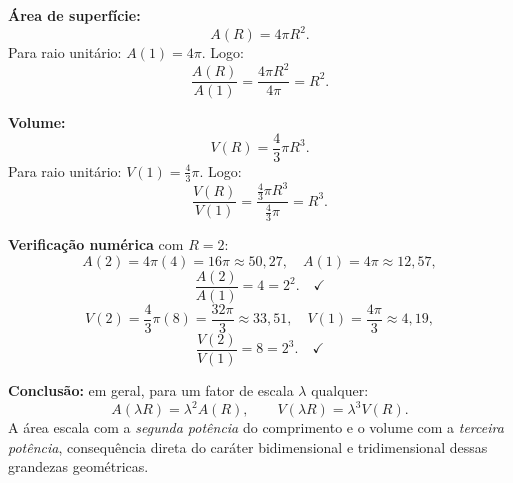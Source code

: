 \textbf{Área de superfície:}
\[
A(R)=4\pi R^2.
\]
Para raio unitário: $A(1)=4\pi$. Logo:
\[
\frac{A(R)}{A(1)}=\frac{4\pi R^2}{4\pi}=R^2.
\]

\textbf{Volume:}
\[
V(R)=\frac{4}{3}\pi R^3.
\]
Para raio unitário: $V(1)=\frac{4}{3}\pi$. Logo:
\[
\frac{V(R)}{V(1)}=\frac{\tfrac{4}{3}\pi R^3}{\tfrac{4}{3}\pi}=R^3.
\]

\textbf{Verificação numérica} com $R=2$:
\[
A(2)=4\pi(4)=16\pi\approx50{,}27, \quad A(1)=4\pi\approx12{,}57,
\]
\[
\frac{A(2)}{A(1)}=4=2^2.\quad \checkmark
\]
\[
V(2)=\frac{4}{3}\pi(8)=\frac{32\pi}{3}\approx33{,}51, \quad V(1)=\frac{4\pi}{3}\approx4{,}19,
\]
\[
\frac{V(2)}{V(1)}=8=2^3.\quad\checkmark
\]

\textbf{Conclusão:} em geral, para um fator de escala $\lambda$ qualquer:
\[
A(\lambda R)=\lambda^2 A(R),\qquad V(\lambda R)=\lambda^3 V(R).
\]
A área escala com a \emph{segunda potência} do comprimento e o volume com a \emph{terceira potência}, consequência direta do caráter bidimensional e tridimensional dessas grandezas geométricas.

